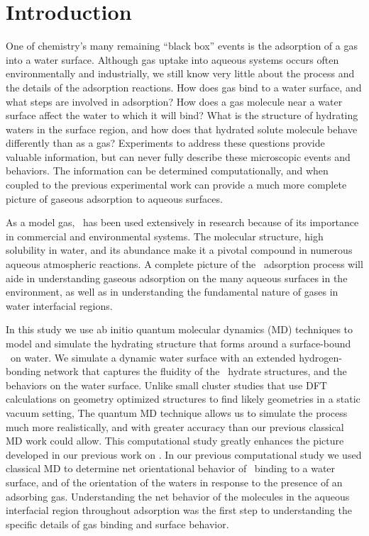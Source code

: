 \section {Introduction}

One of chemistry's many remaining ``black box'' events is the adsorption of a gas into a water surface. Although gas uptake into aqueous systems occurs often environmentally and industrially, we still know very little about the process and the details of the adsorption reactions. How does gas bind to a water surface, and what steps are involved in adsorption? How does a gas molecule near a water surface affect the water to which it will bind? What is the structure of hydrating waters in the surface region, and how does that hydrated solute molecule behave differently than as a gas? Experiments to address these questions provide valuable information, but can never fully describe these microscopic events and behaviors. The information can be determined computationally, and when coupled to the previous experimental work can provide a much more complete picture of gaseous adsorption to aqueous surfaces.

As a model gas, \suldiox~has been used extensively in research because of its importance in commercial and environmental systems.\cite{Boniface2000,Jayne1990,Johns2011,Heber1997,Faloona2009,Clegg2001} The molecular structure, high solubility in water, and its abundance make it a pivotal compound in numerous aqueous atmospheric reactions. A complete picture of the \suldiox~adsorption process will aide in understanding gaseous adsorption on the many aqueous surfaces in the environment, as well as in understanding the fundamental nature of gases in water interfacial regions. 

In this study we use ab initio quantum molecular dynamics (MD) techniques to model and simulate the hydrating structure that forms around a surface-bound \suldiox~on water. We simulate a dynamic water surface with an extended hydrogen-bonding network that captures the fluidity of the \suldiox~hydrate structures, and the behaviors on the water surface. Unlike small cluster studies that use DFT calculations on geometry optimized structures to find likely geometries in a static vacuum setting, The quantum MD technique allows us to simulate the process much more realistically, and with greater accuracy than our previous classical MD work could allow.\cite{Shamay2011} This computational study greatly enhances the picture developed in our previous work on \suldiox. In our previous computational study we used classical MD to determine net orientational behavior of \suldiox~binding to a water surface, and of the orientation of the waters in response to the presence of an adsorbing gas. Understanding the net behavior of the molecules in the aqueous interfacial region throughout adsorption was the first step to understanding the specific details of gas binding and surface behavior. 

